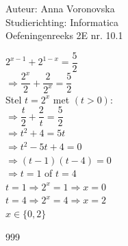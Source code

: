 \documentclass[a4paper]{article}
\begin{document}
  
\noindent \large Auteur: Anna Voronovska \\
\noindent \large Studierichting: Informatica\\
\noindent \large Oefeningenreeks 2E nr. 10.1\\

\medskip

\normalsize

$2^{x-1} + 2^{1-x} = \dfrac{5}{2}$\\

$\Rightarrow \dfrac{2^x}{2} + \dfrac{2}{2^x} = \dfrac{5}{2}$\\

Stel $t = 2^x$ met $(t > 0)$:\\

$\Rightarrow \dfrac{t}{2} + \dfrac{2}{t} = \dfrac{5}{2}$\\

$\Rightarrow t^2 + 4 = 5t$\\

$\Rightarrow t^2 - 5t + 4 = 0$\\

$\Rightarrow (t-1)(t-4) = 0$\\

$\Rightarrow t = 1$ of $t = 4$\\

$t = 1 \Rightarrow 2^x = 1 \Rightarrow x = 0$\\

$t = 4 \Rightarrow 2^x = 4 \Rightarrow x = 2$\\

$x \in \{0, 2\}$


\begin{thebibliography}{999}
\end{thebibliography}
\end{document}
